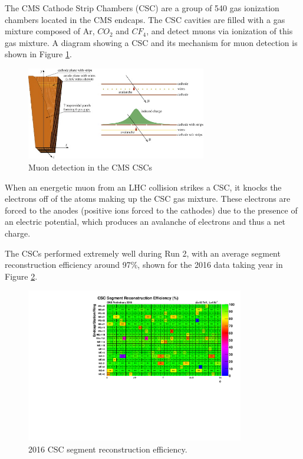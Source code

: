 

The CMS Cathode Strip Chambers (CSC) are a group of 540 gas ionization chambers located in the CMS endcaps. The CSC cavities are filled with a gas mixture composed of Ar, $CO_{2}$ and $CF_{4}$, and detect muons via ionization of this gas mixture. A diagram showing a CSC and its mechanism for muon detection is shown in Figure \ref{fig:CSC_Diagram}. 

\begin{figure}[H]
    \centering
    \includegraphics[width=0.7\textwidth]{Images/CMS/Muons/CSC/CSC_image.jpg}
    \caption{Muon detection in the CMS CSCs}
    \label{fig:CSC_Diagram}
\end{figure}

When an energetic muon from an LHC collision strikes a CSC, it knocks the electrons off of the atoms making up the CSC gas mixture. These electrons are forced to the anodes (positive ions forced to the cathodes) due to the presence of an electric potential, which produces an avalanche of electrons and thus a net charge.

The CSCs performed extremely well during Run 2, with an average segment reconstruction efficiency around 97\%, shown for the 2016 data taking year in Figure \ref{fig:CSC_2016SegHitEff}.

\begin{figure}[H]
    \centering
    \includegraphics[width=0.85\textwidth]{Images/CMS/Muons/CSC/seg_eff_Muon_JSON_June22all_chambers_noErr.pdf}
    \caption{2016 CSC segment reconstruction efficiency.}
    \label{fig:CSC_2016SegHitEff}
\end{figure}